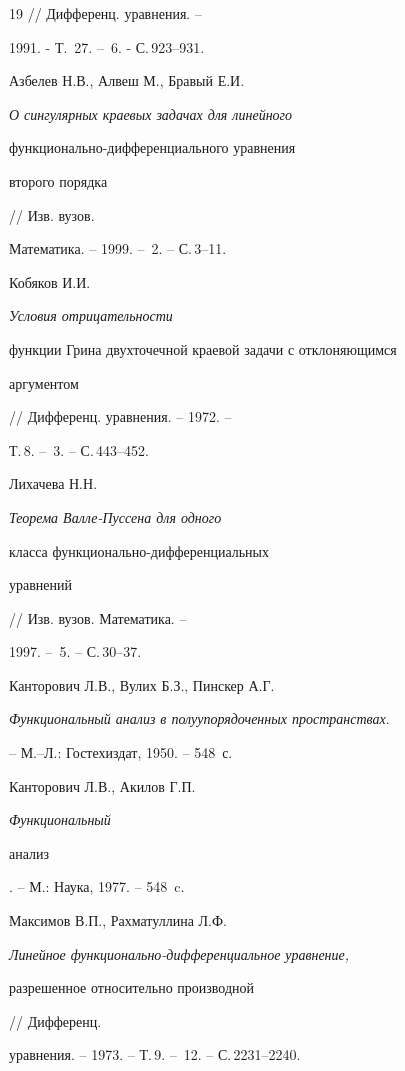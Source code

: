 \begin{thebibliography}{19}
// Дифференц. уравнения. --


1991. - Т.~27. -- \No\,{6}. - С.\,923--931.





 Азбелев Н.В., Алвеш М., Бравый Е.И.


{\em О сингулярных краевых задачах для линейного


функционально-дифференциального уравнения


второго порядка} // Изв. вузов.


Математика. -- 1999. -- \No\,{2}. -- С.\,3--11.





 Кобяков И.И. {\em Условия отрицательности


функции Грина двухточечной краевой задачи с отклоняющимся


аргументом} // Дифференц. уравнения. -- 1972. --


Т.\,8. -- \No\,{3}. -- С.\,443--452.





 Лихачева Н.Н. {\em Теорема Валле-Пуссена для одного


класса функционально-диф\-фе\-рен\-ци\-аль\-ных


уравнений} // Изв. вузов. Математика. --


1997. -- \No\,{5}. -- С.\,30--37.





 Канторович Л.В., Вулих Б.З., Пинскер А.Г.


{\em  Функциональный анализ в полуупорядоченных пространствах}.


-- М.--Л.: Гостехиздат, 1950. -- 548~с.





 Канторович Л.В., Акилов Г.П. {\em Функциональный


анализ}. -- М.: Наука, 1977. -- 548~c.





 Максимов В.П., Рахматуллина Л.Ф.


{\em Линейное функционально-дифференциальное уравнение,


разрешенное относительно производной} // Дифференц.


уравнения. -- 1973. -- Т.\,9. -- \No\,{12}. -- С.\,2231--2240.






\end{thebibliography}
